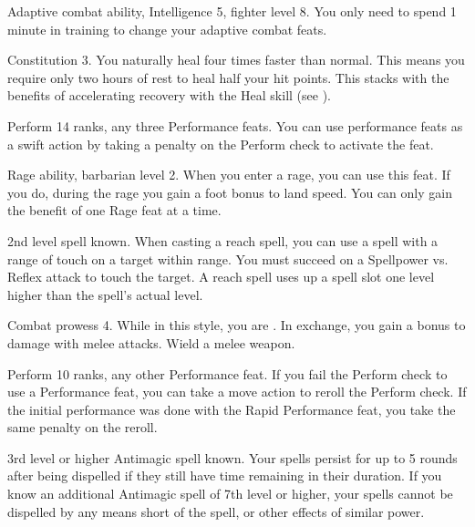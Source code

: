 \featpre Adaptive combat ability, Intelligence 5, fighter level 8.
\featben You only need to spend 1 minute in training to change your adaptive combat feats.

\featpre Constitution 3.
\featben You naturally heal four times faster than normal.
This means you require only two hours of rest to heal half your hit points.
This stacks with the benefits of accelerating recovery with the Heal skill (see ).

\featpres Perform 14 ranks, any three Performance feats.
\featben You can use performance feats as a swift action by taking a  penalty on the Perform check to activate the feat.

\featpre Rage ability, barbarian level 2.
\featben When you enter a rage, you can use this feat. If you do, during the rage you gain a  foot bonus to land speed.
 You can only gain the benefit of one Rage feat at a time.

\featpre 2nd level spell known.
\featben When casting a reach spell, you can use a spell with a range of touch on a target within \rngclose range.
You must succeed on a Spellpower vs. Reflex attack to touch the target.
A reach spell uses up a spell slot one level higher than the spell's actual level.

\featpre Combat prowess 4.
\featben While in this style, you are .
In exchange, you gain a  bonus to damage with melee attacks.
\stylereq Wield a melee weapon.

\featpres Perform 10 ranks, any other Performance feat.
\featben If you fail the Perform check to use a Performance feat, you can take a move action to reroll the Perform check.
If the initial performance was done with the Rapid Performance feat, you take the same  penalty on the reroll.

\featpre 3rd level or higher Antimagic spell known.
\featben Your spells persist for up to 5 rounds after being dispelled if they still have time remaining in their duration.
If you know an additional Antimagic spell of 7th level or higher, your spells cannot be dispelled by any means short of the  spell, or other effects of similar power.

